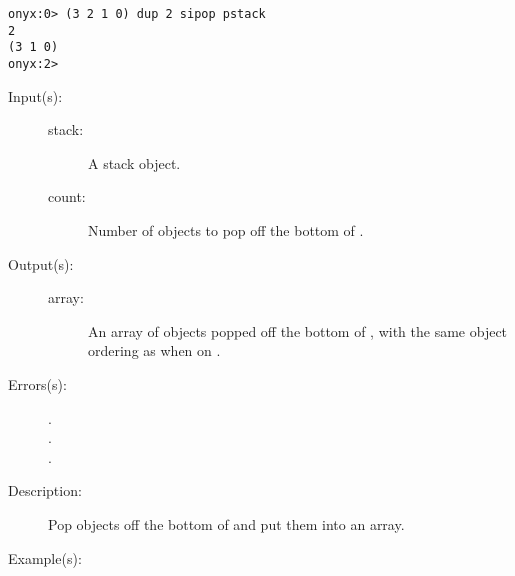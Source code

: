\begin{description}
\begin{description}
\begin{verbatim}
onyx:0> (3 2 1 0) dup 2 sipop pstack
2
(3 1 0)
onyx:2>
		\end{verbatim}
	\end{description}
\label{systemdict:snbpop}
\item[{\onyxop{stack count}{snbpop}{array}}: ]
	\begin{description}\item[]
	\item[Input(s): ]
		\begin{description}\item[]
		\item[stack: ]
			A stack object.
		\item[count: ]
			Number of objects to pop off the bottom of
			.
		\end{description}
	\item[Output(s): ]
		\begin{description}\item[]
		\item[array: ]
			An array of objects popped off the bottom of
			, with the same object ordering as when on
			.
		\end{description}
	\item[Errors(s): ]
		\begin{description}\item[]
		\item[.]
		\item[.]
		\item[.]
		\end{description}
	\item[Description: ]
		Pop  objects off the bottom of  and
		put them into an array.
	\item[Example(s): ]\begin{verbatim}


\end{verbatim}
\end{description}
\end{description}
